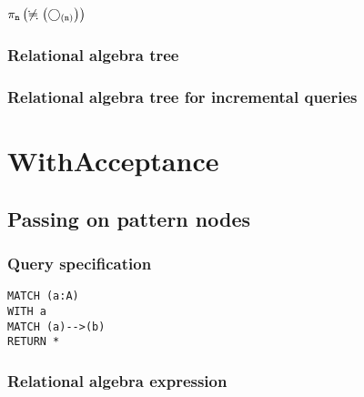 $\projection{\var{n}} \left(\alldifferent{} \left(\getvertices{n}{}\right)\right)$

\subsubsection*{Relational algebra tree}


\subsubsection*{Relational algebra tree for incremental queries}


\section{WithAcceptance}

\subsection{Passing on pattern nodes}

\subsubsection*{Query specification}

\begin{lstlisting}
MATCH (a:A)
WITH a
MATCH (a)-->(b)
RETURN *
\end{lstlisting}

\subsubsection*{Relational algebra expression}

